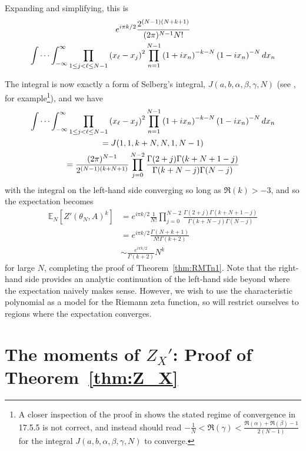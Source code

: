 \documentclass[12pt,a4paper,reqno]{amsart}
\theoremstyle{remark}
\numberwithin{equation}{section}
\newcommand{\E}{\mathbb{E}}
\begin{document}
Expanding and simplifying, this is
\begin{multline*}
e^{i \pi k /2}  \frac{2^{(N-1)(N+k+1)}}{(2\pi)^{N-1} N!} \\
 \idotsint_{-\infty}^{\infty} \prod_{1 \leq j < \ell \leq N-1} \left(x_\ell - x_j\right)^2  \prod_{n=1}^{N-1} \left(1+i x_n\right)^{-k-N}  \left(1-i x_n\right)^{-N}  d x_n
\end{multline*}

The integral is now exactly a form of Selberg's integral, $J(a,b,\alpha,\beta,\gamma,N)$ (see \cite[equation 17.5.2]{Mehta}, for example\footnote{A closer inspection of the proof in \cite{Mehta} shows the stated regime of convergence in 17.5.5 is not correct, and instead should read $-\frac{1}{N} < \Re(\gamma) < \frac{\Re(\alpha)+\Re(\beta)-1}{2(N-1)}$ for the integral $J(a,b,\alpha,\beta,\gamma,N)$ to converge.}), and we have
\begin{multline*}
\idotsint_{-\infty}^{\infty} \prod_{1 \leq j < \ell \leq N-1} \left(x_\ell - x_j\right)^2  \prod_{n=1}^{N-1} \left(1+i x_n\right)^{-k-N}  \left(1-i x_n\right)^{-N}  d x_n \\
=
J(1,1,k+N,N,1,N-1) \\
= \frac{(2\pi)^{N-1}}{2^{(N-1)(k+N+1)}} \prod_{j=0}^{N-2} \frac{\Gamma(2+j) \Gamma(k+N+1-j)}{\Gamma(k+N-j)\Gamma(N-j)}
\end{multline*}
with the integral on the left-hand side converging so long as $\Re(k)>-3$, and so the expectation becomes
\begin{align*}
\E_N\left[ Z'(\theta_N,A)^k \right] &= e^{i \pi k /2} \frac{1}{ N!} \prod_{j=0}^{N-2} \frac{\Gamma(2+j) \Gamma(k+N+1-j)}{\Gamma(k+N-j)\Gamma(N-j)}\\
&=e^{i \pi k /2} \frac{\Gamma(N+k+1)}{ N! \Gamma(k+2)} \\
&\sim  \frac{e^{i \pi k /2}}{\Gamma(k +2)} N^{k}
\end{align*}
for large $N$, completing the proof of Theorem~\ref{thm:RMTn1}. Note that the right-hand side provides an analytic continuation of the left-hand side beyond where the expectation naively makes sense. However, we wish to use the characteristic polynomial as a model for the Riemann zeta function, so will restrict ourselves to regions where the expectation converges.


\section{The moments of $Z_X'$: Proof of Theorem~\ref{thm:Z_X}} \label{sect:ZX}
\end{document}
